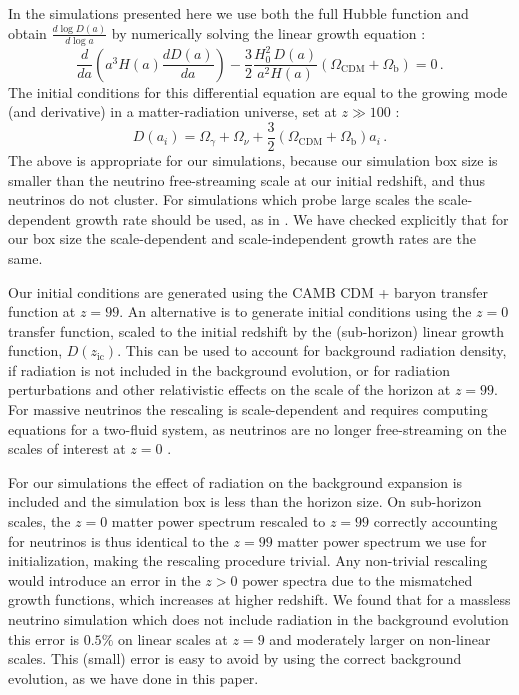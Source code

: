 \documentclass[useAMS, usenatbib]{mnras}
\begin{document}
In the simulations presented here we use both the full Hubble function
and obtain $\frac{d \log D(a)}{d \log a}$ by numerically solving
the linear growth equation \citep{Peebles:1993}:
\begin{equation}
\frac{d}{da}\left(a^3 H(a) \frac{d D(a)}{da}\right) - \frac{3}{2} \frac{H_0^2\,D(a)}{a^2 H(a)} \left(\Omega_\mathrm{CDM} + \Omega_\mathrm{b}\right)= 0\,.
\label{eq:lineargrowth}
\end{equation}
The initial conditions for this differential equation are equal to the growing mode (and derivative) in a matter-radiation universe, set at $z \gg 100$ \citep{Groth:1975}:
\begin{equation}
  D(a_i) = \Omega_\gamma + \Omega_\nu + \frac{3}{2} \left(\Omega_\mathrm{CDM} + \Omega_\mathrm{b}\right) a_i\,.
\end{equation}
The above is appropriate for our simulations, because our simulation box size is smaller than the neutrino free-streaming scale at our initial redshift, and thus neutrinos do not cluster. For simulations which probe large scales the scale-dependent growth rate should be used, as in \cite{OLeary_2012, Zennaro_2017}. We have checked explicitly that for our box size the scale-dependent and scale-independent growth rates are the same.

Our initial conditions are generated using the CAMB CDM + baryon transfer function at $z=99$. An alternative is to generate initial conditions using the $z=0$ transfer function, scaled to the initial redshift by the (sub-horizon) linear growth function, $D(z_\mathrm{ic})$. This can be used to account for background radiation density, if radiation is not included in the background evolution, or for radiation perturbations and other relativistic effects on the scale of the horizon at $z=99$. For massive neutrinos the rescaling is scale-dependent and requires computing equations for a two-fluid system, as neutrinos are no longer free-streaming on the scales of interest at $z=0$ \citep{Zennaro_2017}.

For our simulations the effect of radiation on the background expansion is included and the simulation box is less than the horizon size. On sub-horizon scales, the $z=0$ matter power spectrum rescaled to $z=99$ correctly accounting for neutrinos is thus identical to the $z=99$ matter power spectrum we use for initialization, making the rescaling procedure trivial. Any non-trivial rescaling would introduce an error in the $z > 0$ power spectra due to the mismatched growth functions, which increases at higher redshift. We found that for a massless neutrino simulation which does not include radiation in the background evolution this error is $0.5\%$ on linear scales at $z=9$ and moderately larger on non-linear scales. This (small) error is easy to avoid by using the correct background evolution, as we have done in this paper.

\label{lastpage}


\end{document}
